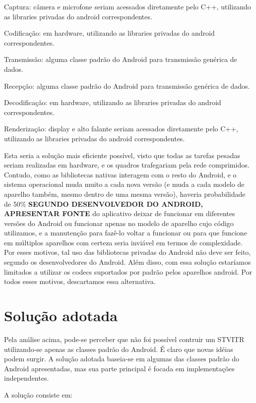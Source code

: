 \documentclass{acm_proc_article-sp}
\newcommand{\todo}[1]{\textcolor[rgb]{1.00,0.00,0.00}{\bf \uppercase{#1}}}
\begin{document}
Captura: câmera e microfone seriam acessados diretamente pelo C++, utilizando as libraries privadas do android correspondentes.

Codificação: em hardware, utilizando as libraries privadas do android correspondentes.

Transmissão: alguma classe padrão do Android para transmissão genérica de dados.

Recepção: alguma classe padrão do Android para transmissão genérica de dados.

Decodificação: em hardware, utilizando as libraries privadas do android correspondentes.

Renderização: display e alto falante seriam acessados diretamente pelo C++, utilizando as libraries privadas do android correspondentes.

Esta seria a solução mais eficiente possível, visto que todas as tarefas pesadas seriam realizadas em hardware, e os quadros trafegariam pela rede comprimidos. Contudo, como as bibliotecas nativas interagem com o resto do Android, e o sistema operacional muda muito a cada nova versão (e muda a cada modelo de aparelho também, mesmo dentro de uma mesma versão), haveria probabilidade de 50\% \todo{segundo desenvolvedor do android, apresentar fonte} do aplicativo deixar de funcionar em diferentes versões do Android ou funcionar apenas no modelo de aparelho cujo código utilizamos, e a manutenção para fazê-lo voltar a funcionar ou para que funcione em múltiplos aparelhos com certeza seria inviável em termos de complexidade. Por esses motivos, tal uso das bibliotecas privadas do Android não deve ser feito, segundo os desenvolvedores do Android. Além disso, com essa solução estaríamos limitados a utilizar os codecs suportados por padrão pelos aparelhos android. Por todos esses motivos, descartamos essa alternativa.

\section{Solução adotada}

Pela análise acima, pode-se perceber que não foi possível contruir um STVITR utilizando-se apenas as classes padrão do Android. É claro que novas idéias podem surgir. A solução adotada baseia-se em algumas das classes padrão do Android apresentadas, mas sua parte principal é focada em implementações independentes.

A solução consiste em:
\end{document}
